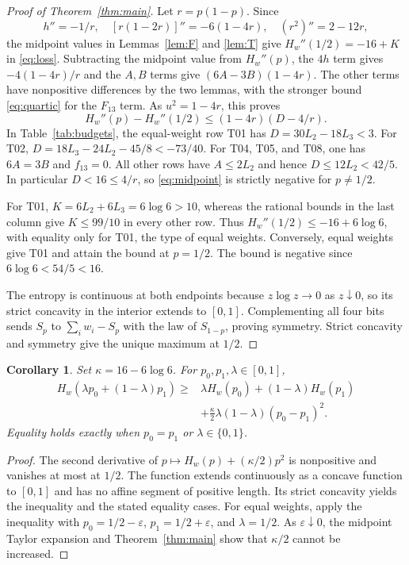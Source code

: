 \documentclass[11pt,a4paper]{article}
\newtheorem{corollary}[theorem]{Corollary}
\begin{document}
\begin{proof}[Proof of Theorem~\ref{thm:main}]
Let \(r=p(1-p)\). Since
\[
 h''=-1/r,\quad [r(1-2r)]''=-6(1-4r),\quad (r^2)''=2-12r,
\]
the midpoint values in Lemmas~\ref{lem:F} and \ref{lem:T} give
\(H_w''(1/2)=-16+K\) in \eqref{eq:loss}. Subtracting the midpoint
value from \(H_w''(p)\), the \(4h\) term gives \(-4(1-4r)/r\)
and the \(A,B\) terms give \((6A-3B)(1-4r)\).
The other terms have nonpositive differences by the two lemmas,
with the stronger bound \eqref{eq:quartic} for the \(F_{13}\) term.
As \(u^2=1-4r\), this proves
\begin{equation}\label{eq:midpoint}
 H_w''(p)-H_w''(1/2)\le(1-4r)(D-4/r).
\end{equation}
In Table~\ref{tab:budgets}, the equal-weight row T01 has
\(D=30L_2-18L_3<3\). For T02,
\(D=18L_3-24L_2-45/8<-73/40\).
For T04, T05, and T08, one has \(6A=3B\) and \(f_{13}=0\).
All other rows have \(A\le2L_2\) and hence \(D\le12L_2<42/5\).
In particular \(D<16\le4/r\), so \eqref{eq:midpoint} is strictly negative
for \(p\ne1/2\).

For T01, \(K=6L_2+6L_3=6\log6>10\), whereas the rational bounds
in the last column give \(K\le99/10\) in every other row.
Thus \(H_w''(1/2)\le-16+6\log6\), with equality only for T01,
the type of equal weights. Conversely, equal weights give T01 and
attain the bound at \(p=1/2\). The bound is negative since
\(6\log6<54/5<16\).

The entropy is continuous at both endpoints because \(z\log z\to0\)
as \(z\downarrow0\), so its strict concavity in the interior extends
to \([0,1]\). Complementing all four bits sends \(S_p\) to
\(\sum_iw_i-S_p\) with the law of \(S_{1-p}\), proving symmetry.
Strict concavity and symmetry give the unique maximum at \(1/2\).
\end{proof}

\begin{corollary}
Set \(\kappa=16-6\log6\). For \(p_0,p_1,\lambda\in[0,1]\),
\begin{align*}
 H_w(\lambda p_0+(1-\lambda)p_1)\ge{}&
 \lambda H_w(p_0)+(1-\lambda)H_w(p_1)\\
 &+\frac{\kappa}{2}\lambda(1-\lambda)(p_0-p_1)^2.
\end{align*}
Equality holds exactly when \(p_0=p_1\) or \(\lambda\in\{0,1\}\).
\end{corollary}
\begin{proof}
The second derivative of \(p\mapsto H_w(p)+(\kappa/2)p^2\) is
nonpositive and vanishes at most at \(1/2\). The function extends
continuously as a concave function to \([0,1]\) and has no affine
segment of positive length. Its strict concavity yields the inequality
and the stated equality cases. For equal weights, apply the inequality
with \(p_0=1/2-\varepsilon\), \(p_1=1/2+\varepsilon\), and
\(\lambda=1/2\). As \(\varepsilon\downarrow0\), the midpoint Taylor
expansion and Theorem~\ref{thm:main} show that \(\kappa/2\) cannot be increased.
\end{proof}
\end{document}
